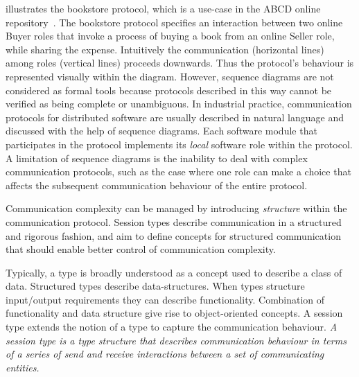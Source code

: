  illustrates the bookstore protocol, which is a use-case
in the ABCD online repository~\cite{usecase_repository}.
The bookstore protocol specifies an interaction between two online Buyer roles
that invoke a process of buying a book from an online Seller role, while
sharing the expense. Intuitively the communication (horizontal lines) among
roles (vertical lines) proceeds downwards.
Thus the protocol's behaviour is represented visually within the diagram.
However, sequence diagrams are not considered as formal tools because
protocols described in this way cannot be verified as being complete or unambiguous.
%
In industrial practice, communication protocols for
distributed software are usually described in natural language and
discussed with the help of sequence diagrams.
Each software module that participates in the
protocol implements
its \emph{local} software role within the protocol.
A limitation of sequence diagrams is the inability to deal with complex
communication protocols, such as the case where one role
can make a choice that affects the subsequent communication behaviour
of the entire protocol.

Communication complexity can be managed by
introducing \emph{structure} within the communication protocol.
Session types describe communication in a structured and rigorous fashion,
and aim to define concepts for structured communication
that should enable better control of communication complexity.

Typically, a type is broadly understood as a concept used
to describe a class of data. Structured types describe
data-structures. When types structure input/output requirements
they can describe functionality. Combination of functionality
and data structure give rise to object-oriented concepts.
A session type extends
the notion of a type to capture the communication behaviour.%
{\em A session type is a type structure that describes communication
	behaviour in terms of a series of send and receive
	interactions between a set of communicating entities.} 

